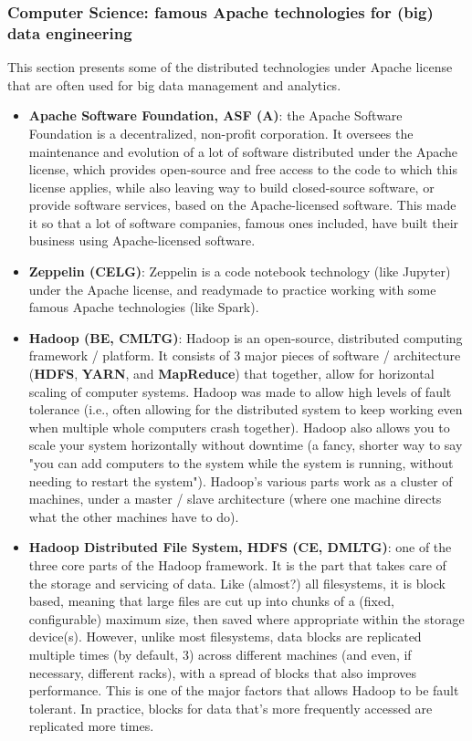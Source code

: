 \documentclass{article}
\begin{document}
\subsubsection*{Computer Science: famous Apache technologies for (big) data engineering}

This section presents some of the distributed technologies under Apache license that are often used for big data management and analytics.

\begin{itemize}

	\item \textbf{Apache Software Foundation, ASF (A)}: the Apache Software Foundation is a decentralized, non-profit corporation. It oversees the maintenance and evolution of a lot of software distributed under the Apache license, which provides open-source and free access to the code to which this license applies, while also leaving way to build closed-source software, or provide software services, based on the Apache-licensed software. This made it so that a lot of software companies, famous ones included, have built their business using Apache-licensed software.

	\item \textbf{Zeppelin (CELG)}: Zeppelin is a code notebook technology (like Jupyter) under the Apache license, and readymade to practice working with some famous Apache technologies (like Spark).

	\item \textbf{Hadoop (BE, CMLTG)}: Hadoop is an open-source, distributed computing framework / platform. It consists of 3 major pieces of software / architecture (\textbf{HDFS}, \textbf{YARN}, and \textbf{MapReduce}) that together, allow for horizontal scaling of computer systems. Hadoop was made to allow high levels of fault tolerance (i.e., often allowing for the distributed system to keep working even when multiple whole computers crash together). Hadoop also allows you to scale your system horizontally without downtime (a fancy, shorter way to say "you can add computers to the system while the system is running, without needing to restart the system"). Hadoop's various parts work as a cluster of machines, under a master / slave architecture (where one machine directs what the other machines have to do).

	\item \textbf{Hadoop Distributed File System, HDFS (CE, DMLTG)}: one of the three core parts of the Hadoop framework. It is the part that takes care of the storage and servicing of data. Like (almost?) all filesystems, it is block based, meaning that large files are cut up into chunks of a (fixed, configurable) maximum size, then saved where appropriate within the storage device(s). However, unlike most filesystems, data blocks are replicated multiple times (by default, 3) across different machines (and even, if necessary, different racks), with a spread of blocks that also improves performance. This is one of the major factors that allows Hadoop to be fault tolerant. In practice, blocks for data that's more frequently accessed are replicated more times.


\end{itemize}
\end{document}

